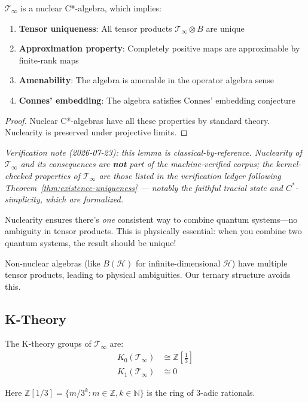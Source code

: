 \begin{lemma}\label{lem:nuclear-structure}
$\mathcal{T}_\infty$ is a nuclear C*-algebra, which implies:
\begin{enumerate}
\item \textbf{Tensor uniqueness}: All tensor products $\mathcal{T}_\infty \otimes B$ are unique
\item \textbf{Approximation property}: Completely positive maps are approximable by finite-rank maps
\item \textbf{Amenability}: The algebra is amenable in the operator algebra sense
\item \textbf{Connes' embedding}: The algebra satisfies Connes' embedding conjecture
\end{enumerate}
\end{lemma}

\begin{proof}
Nuclear C*-algebras have all these properties by standard theory\cite{brown_c_2008, connes_noncommutative_1994}. Nuclearity is preserved under projective limits.
\end{proof}

\noindent\emph{Verification note (2026-07-23): this lemma is classical-by-reference. Nuclearity of $\mathcal{T}_\infty$ and its consequences are \textbf{not} part of the machine-verified corpus; the kernel-checked properties of $\mathcal{T}_\infty$ are those listed in the verification ledger following Theorem~\ref{thm:existence-uniqueness} --- notably the faithful tracial state and $C^*$-simplicity, which \emph{are} formalized.}

\begin{keyidea}
Nuclearity ensures there's \textit{one} consistent way to combine quantum systems—no ambiguity in tensor products. This is physically essential: when you combine two quantum systems, the result should be unique!

Non-nuclear algebras (like $B(\mathcal{H})$ for infinite-dimensional $\mathcal{H}$) have multiple tensor products, leading to physical ambiguities. Our ternary structure avoids this.
\end{keyidea}

\subsection{K-Theory}

\begin{thm}\label{thm:k-theory}
The K-theory groups of $\mathcal{T}_\infty$ are:
\begin{align}
K_0(\mathcal{T}_\infty) &\cong \mathbb{Z}\left[\frac{1}{3}\right] \label{eq:k0-timeless}\\
K_1(\mathcal{T}_\infty) &\cong 0 \label{eq:k1-timeless}
\end{align}

Here $\mathbb{Z}[1/3] = \{m/3^k : m \in \mathbb{Z}, k \in \mathbb{N}\}$ is the ring of $3$-adic rationals.
\end{thm}

